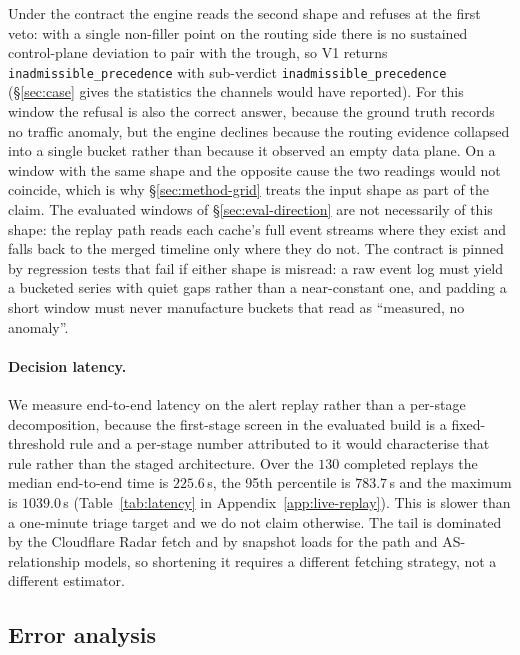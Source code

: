 Under the contract the engine reads the second shape and refuses at the
first veto: with a single non-filler point on the routing side there is no
sustained control-plane deviation to pair with the trough, so V1 returns
\texttt{inadmissible\_precedence} with sub-verdict
\texttt{inadmissible\_precedence} (\S\ref{sec:case} gives the statistics the
channels would have reported). For this window the refusal is also the
correct answer, because the ground truth records no traffic anomaly, but
the engine declines because the routing evidence collapsed into a single
bucket rather than because it observed an empty data plane. On a window
with the same shape and the opposite cause the two readings would not
coincide, which is why \S\ref{sec:method-grid} treats the input shape as
part of the claim. The evaluated windows of \S\ref{sec:eval-direction} are
not necessarily of this shape: the replay path reads each cache's full
event streams where they exist and falls back to the merged timeline only
where they do not. The contract is pinned by regression tests that fail if
either shape is misread: a raw event log must yield a bucketed series with
quiet gaps rather than a near-constant one, and padding a short window
must never manufacture buckets that read as ``measured, no anomaly''.

\paragraph{Decision latency.}
\label{sec:eval-latency}

We measure end-to-end latency on the alert replay rather than a per-stage
decomposition, because the first-stage screen in the evaluated build is a
fixed-threshold rule and a per-stage number attributed to it would
characterise that rule rather than the staged architecture. Over the $130$
completed replays the median end-to-end time is $225.6$\,s, the 95th
percentile is $783.7$\,s and the maximum is $1039.0$\,s
(Table~\ref{tab:latency} in Appendix~\ref{app:live-replay}). This is slower
than a one-minute triage target and we do not claim otherwise. The tail is
dominated by the Cloudflare Radar fetch and by snapshot loads for the path
and AS-relationship models, so shortening it requires a different fetching
strategy, not a different estimator.

\subsection{Error analysis}
\label{sec:eval-errors}

